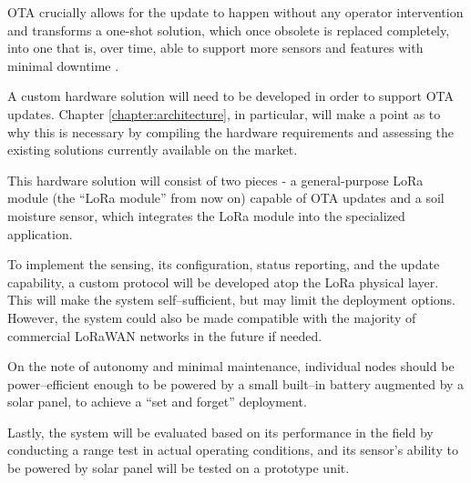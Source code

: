 OTA crucially allows for the update to happen without any operator intervention and transforms a one-shot solution, which once obsolete is replaced completely, into one that is, over time, able to support more sensors and features with minimal downtime \cite{mobility_connected_what_2024,noauthor_android_2024,bucklin_brown_over--air_2024}.

A custom hardware solution will need to be developed in order to support OTA updates. Chapter \ref{chapter:architecture}, in particular, will make a point as to why this is necessary by compiling the hardware requirements and assessing the existing solutions currently available on the market. 

This hardware solution will consist of two pieces - a general-purpose LoRa module (the ``LoRa module'' from now on) capable of OTA updates and a soil moisture sensor, which integrates the LoRa module into the specialized application.

To implement the sensing, its configuration, status reporting, and the update capability, a custom protocol will be developed atop the LoRa physical layer. This will make the system self--sufficient, but may limit the deployment options. However, the system could also be made compatible with the majority of commercial LoRaWAN networks in the future if needed.

On the note of autonomy and minimal maintenance, individual nodes should be power--efficient enough to be powered by a small built--in battery augmented by a solar panel, to achieve a ``set and forget'' deployment. 

Lastly, the system will be evaluated based on its performance in the field by conducting a range test in actual operating conditions, and its sensor's ability to be powered by solar panel will be tested on a prototype unit.